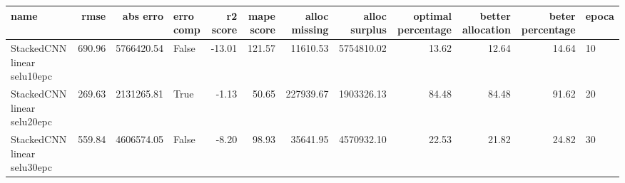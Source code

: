 \begin{tabular}{lrrlrrrrrrrl}
\toprule
name & rmse & abs erro & erro comp & r2 score & mape score & alloc missing & alloc surplus & optimal percentage & better allocation & beter percentage & epoca \\
\midrule
StackedCNN linear selu10epc & 690.96 & 5766420.54 & False & -13.01 & 121.57 & 11610.53 & 5754810.02 & 13.62 & 12.64 & 14.64 & 10 \\
StackedCNN linear selu20epc & 269.63 & 2131265.81 & True & -1.13 & 50.65 & 227939.67 & 1903326.13 & 84.48 & 84.48 & 91.62 & 20 \\
StackedCNN linear selu30epc & 559.84 & 4606574.05 & False & -8.20 & 98.93 & 35641.95 & 4570932.10 & 22.53 & 21.82 & 24.82 & 30 \\
\bottomrule
\end{tabular}
